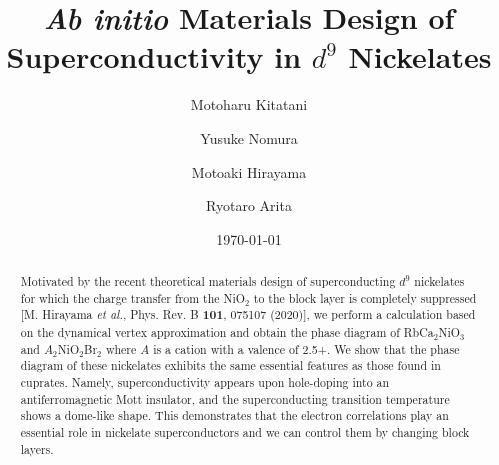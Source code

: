 \documentclass[%
 aip,
 amsmath,amssymb,
 reprint,%
]{revtex4-1}
\begin{document}

\title[Materials design of nickelate superconductors]{{\it Ab initio} Materials Design of Superconductivity in $d^9$ Nickelates}

\author{Motoharu Kitatani}
\author{Yusuke Nomura}

\author{Motoaki Hirayama}


\author{Ryotaro Arita}

\date{\today}%

\begin{abstract}
Motivated by the recent theoretical materials design of superconducting $d^9$ nickelates for which the charge transfer from the NiO$_2$ to the block layer is completely suppressed [M. Hirayama {\it et al.}, Phys. Rev. B {\bf 101}, 075107 (2020)], we perform a calculation based on the dynamical vertex approximation and obtain the phase diagram of RbCa$_2$NiO$_3$ and $A_2$NiO$_2$Br$_2$ where $A$ is a cation with a valence of 2.5+. 
We show that the phase diagram of these nickelates exhibits the same essential features as those found in cuprates. 
Namely, superconductivity appears upon hole-doping into an antiferromagnetic Mott insulator, and the superconducting transition temperature shows a dome-like shape.  
This demonstrates that the electron correlations play an essential role in nickelate superconductors 
and we can control them by changing block layers.
\end{abstract}
\end{document}
